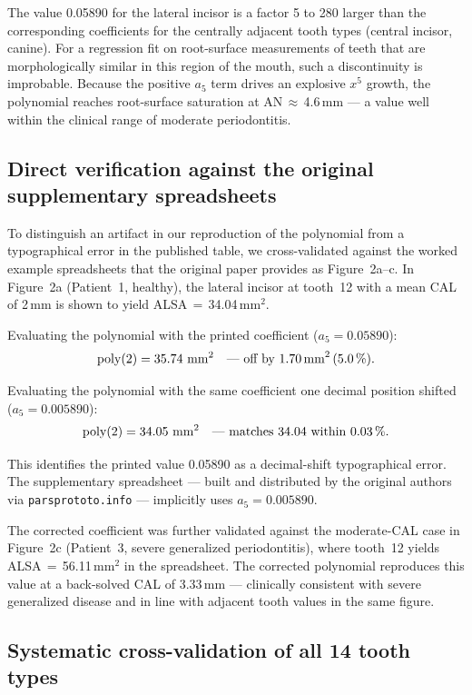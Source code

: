 \documentclass[11pt,a4paper]{article}
\begin{document}
The value 0.05890 for the lateral incisor is a factor 5 to 280 larger
than the corresponding coefficients for the centrally adjacent tooth
types (central incisor, canine). For a regression fit on root-surface
measurements of teeth that are morphologically similar in this region of
the mouth, such a discontinuity is improbable. Because the positive
$a_5$ term drives an explosive $x^5$ growth, the polynomial reaches
root-surface saturation at AN\,$\approx$\,4.6\,mm --- a value well
within the clinical range of moderate periodontitis.

\subsection*{Direct verification against the original supplementary spreadsheets}

To distinguish an artifact in our reproduction of the polynomial from a
typographical error in the published table, we cross-validated against
the worked example spreadsheets that the original paper provides as
Figure~2a--c. In Figure~2a (Patient~1, healthy), the lateral incisor at
tooth~12 with a mean CAL of 2\,mm is shown to yield ALSA\,$=$\,34.04\,mm$^2$.

Evaluating the polynomial with the printed coefficient ($a_5 = 0.05890$):
$$\mathrm{poly}(2) = 35.74~\mathrm{mm}^2 \quad \text{--- off by 1.70\,mm}^2\,(5.0\,\%).$$

Evaluating the polynomial with the same coefficient one decimal position
shifted ($a_5 = 0.005890$):
$$\mathrm{poly}(2) = 34.05~\mathrm{mm}^2 \quad \text{--- matches 34.04 within 0.03\,\%.}$$

This identifies the printed value 0.05890 as a decimal-shift
typographical error. The supplementary spreadsheet --- built and
distributed by the original authors via \texttt{parsprototo.info} ---
implicitly uses $a_5 = 0.005890$.

The corrected coefficient was further validated against the moderate-CAL
case in Figure~2c (Patient~3, severe generalized periodontitis), where
tooth~12 yields ALSA\,$=$\,56.11\,mm$^2$ in the spreadsheet. The
corrected polynomial reproduces this value at a back-solved CAL of
3.33\,mm --- clinically consistent with severe generalized disease and
in line with adjacent tooth values in the same figure.

\subsection*{Systematic cross-validation of all 14 tooth types}
\end{document}
